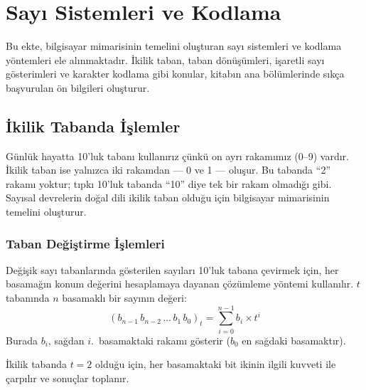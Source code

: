 \chapter{Sayı Sistemleri ve Kodlama}
\label{ch:sayi-sistemleri}

Bu ekte, bilgisayar mimarisinin temelini oluşturan sayı sistemleri ve kodlama yöntemleri ele alınmaktadır. İkilik taban, taban dönüşümleri, işaretli sayı gösterimleri ve karakter kodlama gibi konular, kitabın ana bölümlerinde sıkça başvurulan ön bilgileri oluşturur.

\section{İkilik Tabanda İşlemler}
\label{sec:ikilik-taban}

Günlük hayatta 10'luk tabanı kullanırız çünkü on ayrı rakamımız (0--9) vardır. İkilik taban ise yalnızca iki rakamdan --- 0 ve 1 --- oluşur. Bu tabanda ``2'' rakamı yoktur; tıpkı 10'luk tabanda ``10'' diye tek bir rakam olmadığı gibi. Sayısal devrelerin doğal dili ikilik taban olduğu için bilgisayar mimarisinin temelini oluşturur.

\subsection{Taban Değiştirme İşlemleri}

Değişik sayı tabanlarında gösterilen sayıları 10'luk tabana çevirmek için, her basamağın konum değerini hesaplamaya dayanan çözümleme yöntemi kullanılır. $t$ tabanında $n$ basamaklı bir sayının değeri:
\begin{equation}
(b_{n-1}\, b_{n-2}\, \ldots\, b_1\, b_0)_t = \sum_{i=0}^{n-1} b_i \times t^i
\label{eq:taban-donusum}
\end{equation}
Burada $b_i$, sağdan $i$.~basamaktaki rakamı gösterir ($b_0$ en sağdaki basamaktır).

İkilik tabanda $t = 2$ olduğu için, her basamaktaki bit ikinin ilgili kuvveti ile çarpılır ve sonuçlar toplanır.

